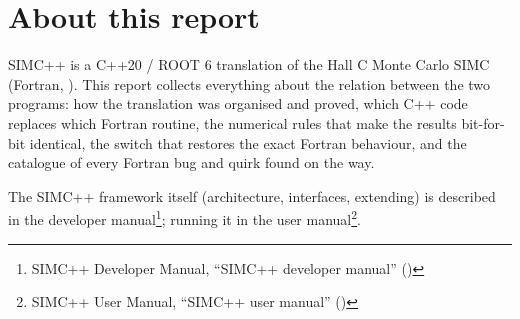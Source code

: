 \chapter*{About this report}\label{translation_report-index}
SIMC++ is a C++20 / ROOT 6 translation of the Hall C Monte Carlo SIMC (Fortran, ). This report collects
everything about the relation between the two programs: how the translation was organised and proved, which C++ code
replaces which Fortran routine, the numerical rules that make the results bit-for-bit identical, the switch that
restores the exact Fortran behaviour, and the catalogue of every Fortran bug and quirk found on the way.

The SIMC++ framework itself (architecture,\allowbreak{} interfaces, extending) is described in the
developer manual\footnote{SIMC++ Developer Manual, ``SIMC++ developer manual'' ()}; running it in the user manual\footnote{SIMC++ User Manual, ``SIMC++ user manual'' ()}.

